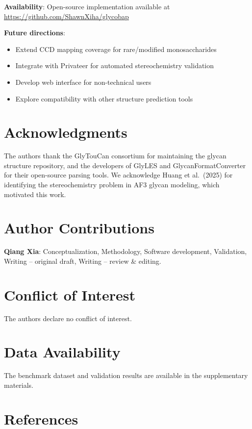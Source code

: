 \documentclass[11pt,a4paper]{article}
\begin{document}
\noindent\textbf{Availability}: Open-source implementation available at \url{https://github.com/ShawnXiha/glycobap}

\noindent\textbf{Future directions}:
\begin{itemize}
\item Extend CCD mapping coverage for rare/modified monosaccharides
\item Integrate with Privateer for automated stereochemistry validation
\item Develop web interface for non-technical users
\item Explore compatibility with other structure prediction tools
\end{itemize}

\section*{Acknowledgments}

The authors thank the GlyTouCan consortium for maintaining the glycan structure repository, and the developers of GlyLES and GlycanFormatConverter for their open-source parsing tools. We acknowledge Huang et al.\ (2025) for identifying the stereochemistry problem in AF3 glycan modeling, which motivated this work.

\section*{Author Contributions}

\noindent\textbf{Qiang Xia}: Conceptualization, Methodology, Software development, Validation, Writing -- original draft, Writing -- review \& editing.

\section*{Conflict of Interest}

The authors declare no conflict of interest.

\section*{Data Availability}

The benchmark dataset and validation results are available in the supplementary materials.

\section*{References}
\end{document}
